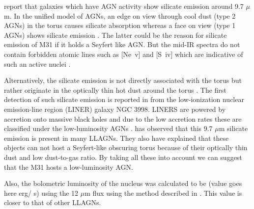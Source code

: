 \documentclass[useAMS,usenatbib,a4paper]{mn2e}
\begin{document}
\citet{Spoon2007} report that galaxies which have AGN activity show silicate emission around 9.7 $\mu$m.
In the unified model of AGNs, an edge on view through cool dust (type 2 AGNs) in the torus causes silicate absorption whereas a face on view (type 1 AGNs) shows silicate emission \citep{AGNtypes1995}. The latter could be the reason for silicate emission of M31 if it holds a Seyfert like AGN. But the mid-IR spectra do not contain forbidden atomic lines such as [Ne~{\sc v}] and [S~{\sc iv}] which are indicative of such an active nuclei \citep{AGNref}.

 Alternatively, the silicate emission is not directly associated with the torus but rather originate in the optically thin hot dust around the torus \citep{Mason2012}. The first detection of such silicate emission is reported in \citet{Sturm2005} from the low-ionization nuclear emission-line region (LINER) galaxy NGC 3998. LINERS are powered by accretion onto massive black holes and due to the low accretion rates these are classified under the low-luminosity AGNs \citep{Kewley2006}. \citealt{Mason2012} has observed that this 9.7 $\mu$m silicate emission is present in many LLAGNs. They also have explained that these objects can not host a Seyfert-like obscuring torus because of their optically thin dust and low dust-to-gas ratio. By taking all these into account we can suggest that the M31 hosts a low-luminosity AGN. 
 
 Also, the bolometric luminosity of the nucleus was calculated to be (value goes here erg/ s) using the 12 $\mu$m flux using the method described in \citet{luminosity}. This value is closer to that of other LLAGNs.
\end{document}
